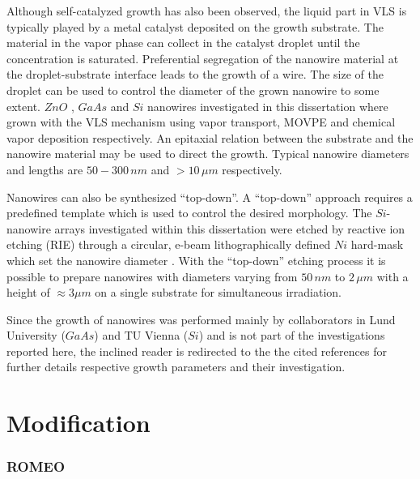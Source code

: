 Although self-catalyzed growth has also been observed, the liquid part in VLS is typically played by a metal catalyst deposited on the growth substrate. The material in the vapor phase can collect in the catalyst droplet until the concentration is saturated. Preferential segregation of the nanowire material at the droplet-substrate interface leads to the growth of a wire. The size of the droplet can be used to control the diameter of the grown nanowire to some extent. $ZnO$ \cite{borchers_catalyst_2006, stichtenoth_dimensionseffekte_2008, muller_structural_2009,ogrisek_kontrolliertes_2013}, $GaAs$ \cite{borgstrom_size-_2004, wacaser_preferential_2009} and $Si$ \cite{lugstein_pressure-induced_2008} nanowires investigated in this dissertation where grown with the VLS mechanism using vapor transport, MOVPE and chemical vapor deposition respectively. An epitaxial relation between the substrate and the nanowire material may be used to direct the growth. Typical nanowire diameters and lengths are $50 - 300\,nm$ and $> 10\,\mu m$ respectively.

Nanowires can also be synthesized ``top-down''. A ``top-down'' approach requires a predefined template which is used to control the desired morphology. The $Si$-nanowire arrays investigated within this dissertation were etched by reactive ion etching (RIE) through a circular, e-beam lithographically defined $Ni$ hard-mask which set the nanowire diameter . With the ``top-down'' etching process it is possible to prepare nanowires with diameters varying from $50\,nm$ to $2\,\mu m$ with a height of $\approx 3\mu m$ on a single substrate for simultaneous irradiation. 

Since the growth of nanowires was performed mainly by collaborators in Lund University ($GaAs$) and TU Vienna ($Si$) and is not part of the investigations reported here, the inclined reader is redirected to the the cited references for further details respective growth parameters and their investigation.

\section{Modification}


\subsubsection{ROMEO}



